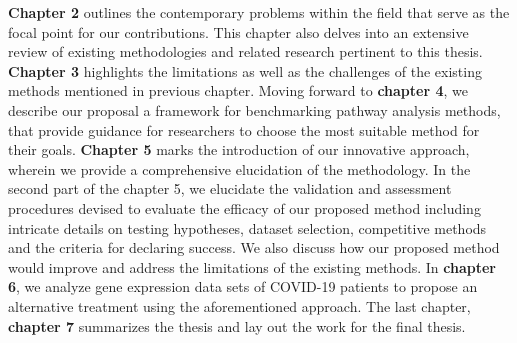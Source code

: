 \textbf{Chapter 2}  outlines the contemporary problems within the field that serve as the focal point for our contributions. This chapter also delves into an extensive review of existing methodologies and related research pertinent to this thesis.
\textbf{Chapter 3} highlights the limitations as well as the challenges of the existing methods mentioned in previous chapter.
Moving forward to \textbf{chapter 4}, we describe our proposal a framework for benchmarking pathway analysis methods, that provide guidance for researchers to choose the most suitable method for their goals. \textbf{Chapter 5} marks the introduction of our innovative approach, wherein we provide a comprehensive elucidation of the methodology. In the second part of the chapter 5, we elucidate the validation and assessment procedures devised to evaluate the efficacy of our proposed method including intricate details on testing hypotheses, dataset selection, competitive methods and the criteria for declaring success. We also discuss how our proposed method would improve and address the limitations of the existing methods.
In \textbf{chapter 6}, we analyze gene expression data sets of COVID-19 patients to propose an alternative treatment using the aforementioned approach.
The last chapter, \textbf{chapter 7} summarizes the thesis and lay out the work for the final thesis.


%
%



